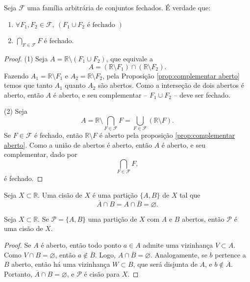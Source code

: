 \begin{prop:fechado}
Seja $\mathcal{F}$ uma família arbitrária de conjuntos fechados.
É verdade que:
\begin{enumerate}
	\item $\forall F_1, F_2 \in \mathcal{F},\ (F_1 \cup F_2 \text{ é fechado })$
	\item $\bigcap_{F \in \mathcal{F}} F$ é fechado.
\end{enumerate}
\begin{proof}
	(1) Seja $A = \mathbb{R} \setminus (F_1 \cup F_2)$, que equivale a
	\[
		A = (\mathbb{R} \setminus F_1) \cap (\mathbb{R} \setminus F_2).
	\]
	Fazendo $A_1 = \mathbb{R} \setminus F_1$ e $A_2 = \mathbb{R} \setminus F_2$, pela Proposição
	\ref{prop:complementar aberto} temos que tanto $A_1$ quanto $A_2$ são abertos.
	Como a interseção de dois abertos é aberto, então $A$ é aberto, e seu complementar --
	$F_1 \cup F_2$ -- deve ser fechado.

	(2) Seja
	\[
		A = \mathbb{R} \setminus \bigcap_{F \in \mathcal{F}} F = \bigcup_{F \in \mathcal{F}}
		(\mathbb{R} \setminus F).
	\]
	Se $F \in \mathcal{F}$ é fechado, então $\mathbb{R} \setminus F$ é aberto pela proposição
	\ref{prop:complementar aberto}. Como a união de abertos é aberto, então $A$ é aberto,
	e seu complementar, dado por
	\[
		\bigcap_{F \in \mathcal{F}} F,
	\]
	é fechado.
\end{proof}
\end{prop:fechado}

\begin{def:cisao}
Seja $X \subset \mathbb{R}$. Uma cisão de $X$ é uma partição $\{A, B\}$ de $X$
tal que
\[
	\overline{A} \cap B = A \cap \overline{B} = \varnothing.
\]
\end{def:cisao}

\begin{prop:cisao}
Seja $X \subset \mathbb{R}$. Se $\mathcal{P} = \{A, B\}$ uma partição de $X$
com $A$ e $B$ abertos, então $\mathcal{P}$ é uma cisão de $X$.
\begin{proof}
	Se $A$ é aberto, então todo ponto $a \in A$ admite uma vizinhança $V \subset A$.
	Como $V \cap B = \varnothing$, então $a \notin \overline{B}$. Logo,
	$A \cap \overline{B} = \varnothing$. Analogamente, se $b$ pertence a $B$ aberto,
	então há uma vizinhança $W \subset B$, que será disjunta de $A$, e
	$b \notin \overline{A}$. Portanto, $\overline{A} \cap B = \varnothing$, e
	$\mathcal{P}$ é cisão para $X$.
\end{proof}
\end{prop:cisao}

